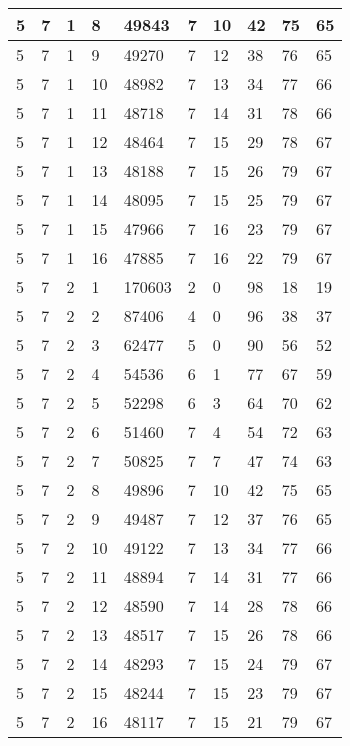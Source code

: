 \begin{table}[!ht]
\begin{tabular}{|l|l|l|l|l|l|l|l|l|l|}
        5 & 7 & 1 & 8 & 49843 & 7 & 10 & 42 & 75 & 65 \\ \hline
        5 & 7 & 1 & 9 & 49270 & 7 & 12 & 38 & 76 & 65 \\ \hline
        5 & 7 & 1 & 10 & 48982 & 7 & 13 & 34 & 77 & 66 \\ \hline
        5 & 7 & 1 & 11 & 48718 & 7 & 14 & 31 & 78 & 66 \\ \hline
        5 & 7 & 1 & 12 & 48464 & 7 & 15 & 29 & 78 & 67 \\ \hline
        5 & 7 & 1 & 13 & 48188 & 7 & 15 & 26 & 79 & 67 \\ \hline
        5 & 7 & 1 & 14 & 48095 & 7 & 15 & 25 & 79 & 67 \\ \hline
        5 & 7 & 1 & 15 & 47966 & 7 & 16 & 23 & 79 & 67 \\ \hline
        5 & 7 & 1 & 16 & 47885 & 7 & 16 & 22 & 79 & 67 \\ \hline
        5 & 7 & 2 & 1 & 170603 & 2 & 0 & 98 & 18 & 19 \\ \hline
        5 & 7 & 2 & 2 & 87406 & 4 & 0 & 96 & 38 & 37 \\ \hline
        5 & 7 & 2 & 3 & 62477 & 5 & 0 & 90 & 56 & 52 \\ \hline
        5 & 7 & 2 & 4 & 54536 & 6 & 1 & 77 & 67 & 59 \\ \hline
        5 & 7 & 2 & 5 & 52298 & 6 & 3 & 64 & 70 & 62 \\ \hline
        5 & 7 & 2 & 6 & 51460 & 7 & 4 & 54 & 72 & 63 \\ \hline
        5 & 7 & 2 & 7 & 50825 & 7 & 7 & 47 & 74 & 63 \\ \hline
        5 & 7 & 2 & 8 & 49896 & 7 & 10 & 42 & 75 & 65 \\ \hline
        5 & 7 & 2 & 9 & 49487 & 7 & 12 & 37 & 76 & 65 \\ \hline
        5 & 7 & 2 & 10 & 49122 & 7 & 13 & 34 & 77 & 66 \\ \hline
        5 & 7 & 2 & 11 & 48894 & 7 & 14 & 31 & 77 & 66 \\ \hline
        5 & 7 & 2 & 12 & 48590 & 7 & 14 & 28 & 78 & 66 \\ \hline
        5 & 7 & 2 & 13 & 48517 & 7 & 15 & 26 & 78 & 66 \\ \hline
        5 & 7 & 2 & 14 & 48293 & 7 & 15 & 24 & 79 & 67 \\ \hline
        5 & 7 & 2 & 15 & 48244 & 7 & 15 & 23 & 79 & 67 \\ \hline
        5 & 7 & 2 & 16 & 48117 & 7 & 15 & 21 & 79 & 67 \\ \hline

\end{tabular}
\end{table}
